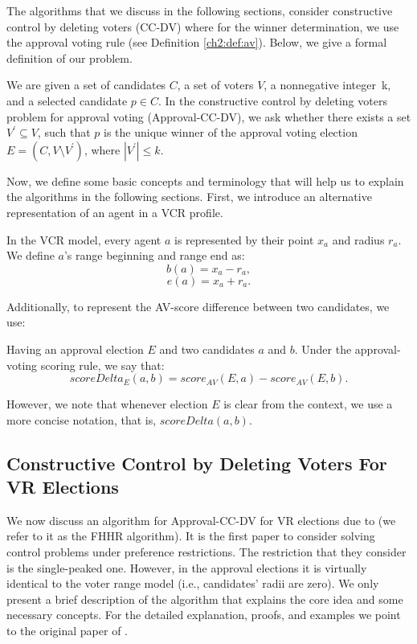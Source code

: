 The algorithms that we discuss in the following sections, consider constructive control by deleting voters (CC-DV)
where for the winner determination, we use the approval voting rule (see Definition \ref{ch2:def:av}).
Below, we give a formal definition of our problem.
\begin{definition}\label{ch5:def:av-cc-dv}
    We are given a set of candidates $C$, a set of voters $V$, a nonnegative integer~k, and a selected candidate $p \in C$.
    In the constructive control by deleting voters problem for approval voting (Approval-CC-DV),
    we ask whether there exists a set $V^{\prime} \subseteq V$,
    such that $p$ is the unique winner of the approval voting election $E = (C, V \setminus V^{\prime})$, where $|V^{\prime}| \leq k$.
\end{definition}

\noindent Now, we define some basic concepts and terminology that will help us to explain the algorithms in the following sections.
First, we introduce an alternative representation of an agent in a VCR profile.
\begin{definition}\label{ch5:def:vcr-range-notation}
    In the VCR model, every agent $a$ is represented by their point $x_a$ and radius $r_a$.
    We define $a$'s range beginning and range end as: \[b(a) = x_a - r_a,\] \[e(a) = x_a + r_a.\]
\end{definition}
\noindent Additionally, to represent the AV-score difference between two candidates, we use:
\begin{definition}\label{ch5:def:av-score-notation}
    Having an approval election $E$ and two candidates $a$ and $b$. 
    Under the approval-voting scoring rule, we say that:
    \[scoreDelta_{E}(a,b) = score_{AV}(E,a) - score_{AV}(E,b).\]
\end{definition}
\noindent However, we note that whenever election $E$ is clear from the context,
we use a more concise notation, that is, $scoreDelta(a,b)$.

\subsection{Constructive Control by Deleting Voters For VR Elections}\label{ch5:sec:1:cc-dv-vr}
We now discuss an algorithm for Approval-CC-DV for VR elections due to \cite{control-sp-shield-faliszewski-hemaspaandra}
(we refer to it as the FHHR algorithm).
It is the first paper to consider solving control problems under preference restrictions.
The restriction that they consider is the single-peaked one.
However, in the approval elections it is virtually identical to the voter range model (i.e., candidates' radii are zero).
We only present a brief description of the algorithm that explains the core idea and some necessary concepts.
For the detailed explanation, proofs, and examples we point to the original paper of \cite{control-sp-shield-faliszewski-hemaspaandra}.

